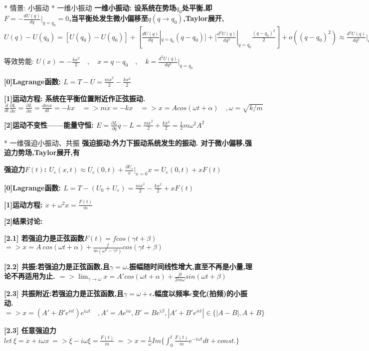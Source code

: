 	* 情景: 小振动
		* 一维小振动
			\bf{一维小振动}:
				设系统在势场$q_0$处平衡,即$F = -\frac{dU(q)}{dq}|_{q=q_0} = 0$,当平衡处发生微小偏移至$q(q\to q_0)$,Taylor展开,
				$U(q) - U(q_0) = [U(q_0) - U(q_0)] + [\frac{d U(q)}{dq}|_{q=q_0} (q - q_0)]+ [\frac{d^2 U(q)}{dq^2}|_{q=q_0} \frac{(q - q_0)^2}{2}] + o((q - q_0)^2) \approx \frac{d^2 U(q)}{dq^2}|_{q=q_0} \frac{(q - q_0)^2}{2}$
			
			等效势能:
			$U(x) = - \frac{k x^2}{2} \quad , \quad x = q-q_0 \quad ,\quad k = \frac{d^2 U(q)}{dq^2}|_{q=q_0}$
			
			\bf{[0]Lagrange函数}:
			$L = T - U = \frac{m \dot x^2}{2} - \frac{k x^2}{2}$
			
			\bf{[1]运动方程}: 系统在平衡位置附近作正弦振动.
			$\frac{d}{dt} \frac{∂ L}{∂ \dot x} = \frac{∂ L}{∂ x} = \frac{d m\dot x}{dt} = -kx \quad => m \ddot x = -kx \quad => x = A cos(\omega t + \alpha) \quad , \omega = \sqrt{k/m}$
			
			\bf{[2]运动不变性——能量守恒}:
			$E = \frac{∂ L}{∂ \dot q}\dot q - L = \frac{m \dot x^2}{2} + \frac{k x^2}{2} = \frac{1}{2} m \omega^2 A^2$


		* 一维强迫小振动、共振
			\bf{强迫振动}:外力下振动系统发生的振动. 对于微小偏移,强迫力势场,Taylor展开,有
			
			\bf{强迫力$F(t)$}:
				$U_e(x,t) \approx U_e(0,t) + \frac{∂ U_e}{x}|_{x=0}x = U_e(0,t) + xF(t)$
			
			\bf{[0]Lagrange函数}:
				$L = T - (U_0 + U_e) = \frac{m \dot x^2}{2} - \frac{k x^2}{2} + xF(t)$
			
			\bf{[1]运动方程}:
				$\ddot x + \omega^2 x = \frac{F(t)}{m}$
			
			\bf{[2]结果讨论}:
			
			\bf{[2.1]} 若强迫力是正弦函数$F(t) = f cos(\gamma t + \beta)$
				$ => x = A\ cos(\omega t + \alpha) + \frac{f}{m(\omega^2 - \gamma^2)} cos(\gamma t + \beta)$
				
			\bf{[2.2]} \bf{共振}:若强迫力是正弦函数,且$\gamma = \omega$.\quad 振幅随时间线性增大,直至不再是小量,理论不再适用为止.
			$ => \lim_{\gamma \to \omega}x = A'cos(\omega t + \alpha) + \frac{f t}{2m\omega} sin(\omega t + \beta)$
			
			\bf{[2.3]} 共振附近:若强迫力是正弦函数,且$\gamma = \omega + \epsilon$.\quad 幅度以频率$\epsilon$变化(\bf{拍频})的小振动.
			$ => x = (A' + B' e^{i\epsilon t})e^{i\omega t} \quad ,A' = Ae^{i\alpha},B' = Be^{i\beta},|A' + B' e^{i\epsilon t}| \in \{|A-B|,A+B\} $
			
			\bf{[2.3]} 任意强迫力
			$let\ \xi = \dot x + i\omega x\ => \dot \xi - i\omega \xi = \frac{F(t)}{m}  \ => x = \frac{1}{\omega}Im\{\int_0^t \frac{F(t)}{m}e^{-i\omega t}dt + const.\}$


